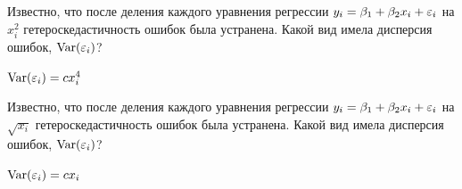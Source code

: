 \begin{problem}
Известно, что после деления каждого уравнения регрессии $y_i = \beta_1 + \beta_2 x_i + \varepsilon_i$ на $x_i^2$ гетероскедастичность ошибок была устранена. Какой вид имела дисперсия ошибок, $\operatorname{Var}(\varepsilon_i)$?


\begin{sol}
$\operatorname{Var}(\varepsilon_i)=cx_i^4$
\end{sol}
\end{problem}



\begin{problem}
Известно, что после деления каждого уравнения регрессии $y_i = \beta_1 + \beta_2 x_i + \varepsilon_i$ на $\sqrt{x_i}$ гетероскедастичность ошибок была устранена. Какой вид имела дисперсия ошибок, $\operatorname{Var}(\varepsilon_i)$?

\begin{sol}
$\operatorname{Var}(\varepsilon_i)=c x_i$
\end{sol}
\end{problem}



